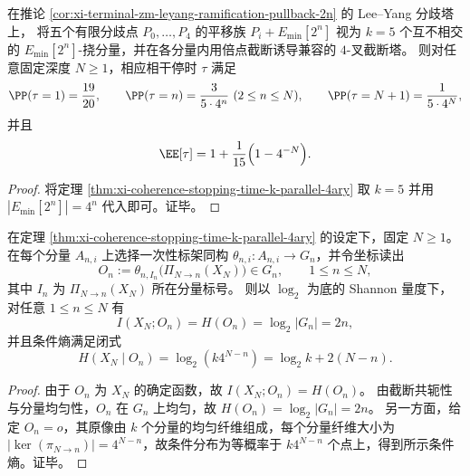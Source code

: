 \begin{corollary}\label{cor:xi-coherence-stopping-time-leyang-k5}
在推论 \ref{cor:xi-terminal-zm-leyang-ramification-pullback-2n} 的 Lee--Yang 分歧塔上，
将五个有限分歧点 \(P_0,\dots,P_4\) 的平移族
\(
P_i+E_{\min}[2^n]
\)
视为 \(k=5\) 个互不相交的 \(E_{\min}[2^n]\)-挠分量，并在各分量内用倍点截断诱导兼容的 \(4\)-叉截断塔。
则对任意固定深度 \(N\ge 1\)，相应相干停时 \(\tau\) 满足
\[
\PP(\tau=1)=\frac{19}{20},\qquad
\PP(\tau=n)=\frac{3}{5\cdot 4^{n}}\ (2\le n\le N),\qquad
\PP(\tau=N+1)=\frac{1}{5\cdot 4^{N}},
\]
并且
\[
\EE[\tau]=1+\frac{1}{15}\Bigl(1-4^{-N}\Bigr).
\]
\end{corollary}
\begin{proof}
将定理 \ref{thm:xi-coherence-stopping-time-k-parallel-4ary} 取 \(k=5\) 并用 \(|E_{\min}[2^n]|=4^n\) 代入即可。证毕。
\end{proof}

\begin{proposition}[分辨率读出与信息增益的严格恒等式]\label{prop:xi-coherence-resolution_information_identity}
在定理 \ref{thm:xi-coherence-stopping-time-k-parallel-4ary} 的设定下，固定 \(N\ge 1\)。
在每个分量 \(A_{n,i}\) 上选择一次性标架同构 \(\theta_{n,i}:A_{n,i}\to G_n\)，并令坐标读出
\[
O_n:=\theta_{n,I_n}\!\bigl(\Pi_{N\to n}(X_N)\bigr)\in G_n,\qquad 1\le n\le N,
\]
其中 \(I_n\) 为 \(\Pi_{N\to n}(X_N)\) 所在分量标号。
则以 \(\log_2\) 为底的 Shannon 量度下，对任意 \(1\le n\le N\) 有
\[
I(X_N;O_n)=H(O_n)=\log_2|G_n|=2n,
\]
并且条件熵满足闭式
\[
H(X_N\mid O_n)=\log_2(k4^{N-n})=\log_2 k+2(N-n).
\]
\end{proposition}
\begin{proof}
由于 \(O_n\) 为 \(X_N\) 的确定函数，故 \(I(X_N;O_n)=H(O_n)\)。
由截断共轭性与分量均匀性，\(O_n\) 在 \(G_n\) 上均匀，故 \(H(O_n)=\log_2|G_n|=2n\)。
另一方面，给定 \(O_n=o\)，其原像由 \(k\) 个分量的均匀纤维组成，每个分量纤维大小为 \(|\ker(\pi_{N\to n})|=4^{N-n}\)，故条件分布为等概率于 \(k4^{N-n}\) 个点上，得到所示条件熵。证毕。
\end{proof}

